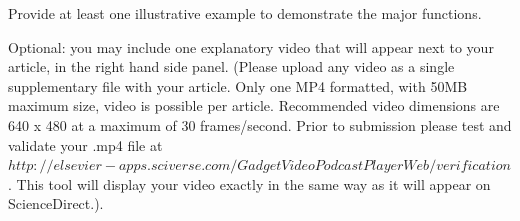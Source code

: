 Provide at least one illustrative example to demonstrate the major functions.

Optional: you may include one explanatory video that will appear next to your article, in the right hand side panel. (Please upload any video as a single supplementary file with your article. Only one MP4 formatted, with 50MB maximum size, video is possible per article. Recommended video dimensions are 640 x 480 at a maximum of 30 frames/second. Prior to submission please test and validate your .mp4 file at $ http://elsevier-apps.sciverse.com/GadgetVideoPodcastPlayerWeb/verification$. This tool will display your video exactly in the same way as it will appear on ScienceDirect.).